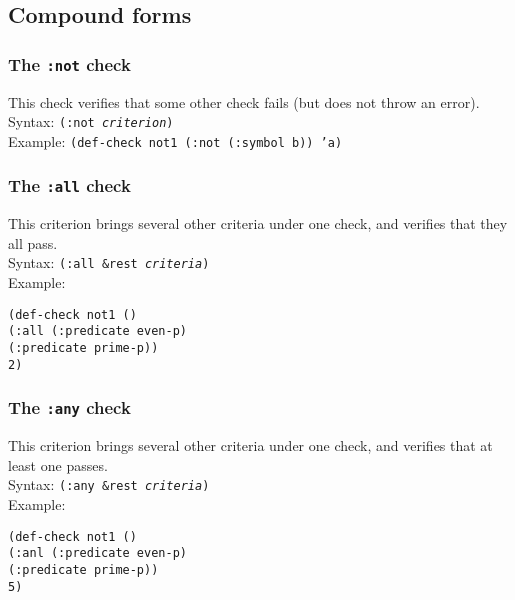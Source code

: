 \documentclass{article}
\begin{document}
% 

\subsection{Compound forms}

\subsubsection{The \texttt{:not} check} 
This check verifies that some other check fails (but does not throw an
error).
\\ Syntax: \texttt{(:not \emph{criterion})}
\\ Example: \texttt{(def-check not1 (:not (:symbol b)) 'a)}

\subsubsection{The \texttt{:all} check} 
This criterion brings several other criteria under one check, and
verifies that they all pass.
\\ Syntax: \texttt{(:all \&rest \emph{criteria})}
\\ Example:
\begin{tabbing}
\texttt{(de}\=\texttt{f-}\=\texttt{check not1 ()}
\\ \>\>\texttt{(:all }\=\texttt{(:predicate even-p)}
\\ \>\>\>\texttt{(:predicate prime-p))}
\\ \>\texttt{2)}
\end{tabbing}

\subsubsection{The \texttt{:any} check} 
This criterion brings several other criteria under one check, and
verifies that at least one passes.
\\ Syntax: \texttt{(:any \&rest \emph{criteria})}
\\ Example:
\begin{tabbing}
\texttt{(de}\=\texttt{f-}\=\texttt{check not1 ()}
\\ \>\>\texttt{(:anl }\=\texttt{(:predicate even-p)}
\\ \>\>\>\texttt{(:predicate prime-p))}
\\ \>\texttt{5)}
\end{tabbing}
\end{document}
